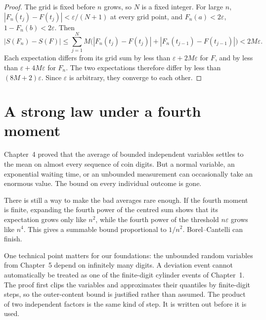 \begin{proof}
The grid is fixed before $n$ grows, so $N$ is a fixed integer. For large $n$, $|F_n(t_j)-F(t_j)|<\varepsilon/(N+1)$ at every grid point, and $F_n(a)<2\varepsilon$, $1-F_n(b)<2\varepsilon$. Then
\[
 |S(F_n)-S(F)|
 \le\sum_{j=1}^N M\bigl(|F_n(t_j)-F(t_j)|+|F_n(t_{j-1})-F(t_{j-1})|\bigr)
 <2M\varepsilon.
\]
Each expectation differs from its grid sum by less than $\varepsilon+2M\varepsilon$ for $F$, and by less than $\varepsilon+4M\varepsilon$ for $F_n$. The two expectations therefore differ by less than $(8M+2)\varepsilon$. Since $\varepsilon$ is arbitrary, they converge to each other.
\end{proof}

\section{A strong law under a fourth moment}

Chapter~4 proved that the average of bounded independent variables settles to the mean on almost every sequence of coin digits. But a normal variable, an exponential waiting time, or an unbounded measurement can occasionally take an enormous value. The bound on every individual outcome is gone.

There is still a way to make the bad averages rare enough. If the fourth moment is finite, expanding the fourth power of the centred sum shows that its expectation grows only like $n^2$, while the fourth power of the threshold $n\varepsilon$ grows like $n^4$. This gives a summable bound proportional to $1/n^2$. Borel--Cantelli can finish.

One technical point matters for our foundations: the unbounded random variables from Chapter~5 depend on infinitely many digits. A deviation event cannot automatically be treated as one of the finite-digit cylinder events of Chapter~1. The proof first clips the variables and approximates their quantiles by finite-digit steps, so the outer-content bound is justified rather than assumed. The product of two independent factors is the same kind of step. It is written out before it is used.

